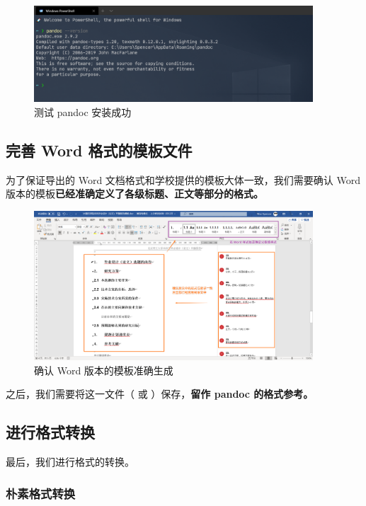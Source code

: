 \begin{figure}[H]
  \flushright
  \includegraphics[width=0.93\textwidth]{images/pandoc_test.png}
  \caption{测试 pandoc 安装成功}
  \label{pandoc_test}
\end{figure}

\subsection{完善 Word 格式的模板文件}

为了保证导出的 Word 文档格式和学校提供的模板大体一致，我们需要确认 Word 版本的模板\textbf{已经准确定义了各级标题、正文等部分的格式。}

\begin{figure}[H]
  \flushright
  \includegraphics[width=0.93\textwidth]{images/latex_pandoc_word.png}
  \caption{确认 Word 版本的模板准确生成}
  \label{latex_pandoc_word}
\end{figure}

之后，我们需要将这一文件（ 或 ）保存，\textbf{留作 pandoc 的格式参考。}

\subsection{进行格式转换}

最后，我们进行格式的转换。

\subsubsection{朴素格式转换}

